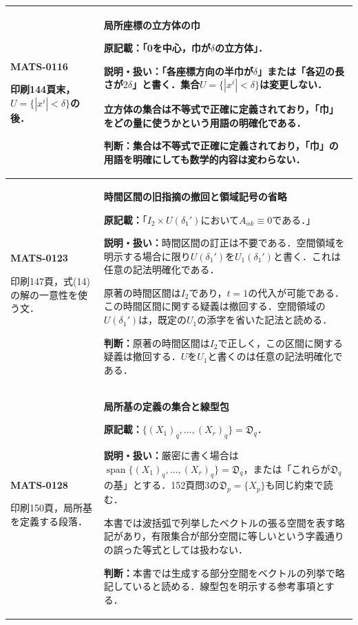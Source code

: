\documentclass[a4paper,10pt]{ltjsarticle}
\begin{document}
\begin{longtable}{@{}>{\raggedright\arraybackslash}p{.19\linewidth}>{\raggedright\arraybackslash}p{.77\linewidth}@{}}
\hline
\hypertarget{MATS-0116}{}\textbf{MATS-0116}\par 印刷144頁末，$U=\{|x^i|<\delta\}$の後． & \textbf{局所座標の立方体の巾}\par\textbf{原記載：}「0を中心，巾が$\delta$の立方体」．\par\textbf{説明・扱い：}「各座標方向の半巾が$\delta$」または「各辺の長さが$2\delta$」と書く．集合$U=\{|x^i|<\delta\}$は変更しない．\par 立方体の集合は不等式で正確に定義されており，「巾」をどの量に使うかという用語の明確化である．\par\textbf{判断：}集合は不等式で正確に定義されており，「巾」の用語を明確にしても数学的内容は変わらない． \\[3pt]
\hline
\hypertarget{MATS-0123}{}\textbf{MATS-0123}\par 印刷147頁，式(14)の解の一意性を使う文． & \textbf{時間区間の旧指摘の撤回と領域記号の省略}\par\textbf{原記載：}「$I_2\times U(\delta_1\prime)$において$A_{\alpha k}\equiv0$である．」\par\textbf{説明・扱い：}時間区間の訂正は不要である．空間領域を明示する場合に限り$U(\delta_1\prime)$を$U_1(\delta_1\prime)$と書く．これは任意の記法明確化である．\par 原著の時間区間は$I_2$であり，$t=1$の代入が可能である．この時間区間に関する疑義は撤回する．空間領域の$U(\delta_1\prime)$は，既定の$U_1$の添字を省いた記法と読める．\par\textbf{判断：}原著の時間区間は$I_2$で正しく，この区間に関する疑義は撤回する．$U$を$U_1$と書くのは任意の記法明確化である． \\[3pt]
\hline
\hypertarget{MATS-0128}{}\textbf{MATS-0128}\par 印刷150頁，局所基を定義する段落． & \textbf{局所基の定義の集合と線型包}\par\textbf{原記載：}$\{(X_1)_q,\ldots,(X_r)_q\}=\mathfrak D_q$．\par\textbf{説明・扱い：}厳密に書く場合は$\operatorname{span}\{(X_1)_q,\ldots,(X_r)_q\}=\mathfrak D_q$，または「これらが$\mathfrak D_q$の基」とする．152頁問3の$\mathfrak D_p=\{X_p\}$も同じ約束で読む．\par 本書では波括弧で列挙したベクトルの張る空間を表す略記があり，有限集合が部分空間に等しいという字義通りの誤った等式としては扱わない．\par\textbf{判断：}本書では生成する部分空間をベクトルの列挙で略記していると読める．線型包を明示する参考事項とする． \\[3pt]
\hline

\end{longtable}
\end{document}

